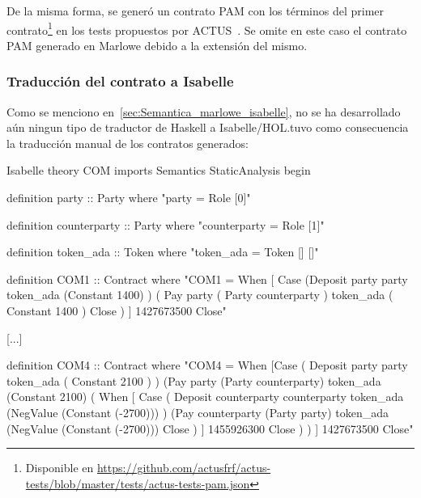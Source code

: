 \documentclass[12pt]{book}
\begin{document}
De la misma forma, se generó un contrato PAM con los términos del primer contrato\footnote{Disponible en \url{https://github.com/actusfrf/actus-tests/blob/master/tests/actus-tests-pam.json}} en los tests propuestos por ACTUS~\cite{ACTUS_Tests}. Se omite en este caso el contrato PAM generado en Marlowe debido a la extensión del mismo.

\subsubsection{Traducción del contrato a Isabelle}

Como se menciono en~\ref{sec:Semantica_marlowe_isabelle}, no se ha desarrollado aún ningun tipo de traductor de Haskell a Isabelle/HOL.\@Esto tuvo como consecuencia la traducción manual de los contratos generados:

\begin{code}[title=Teoría COM.]{Isabelle}
theory COM 
imports Semantics StaticAnalysis
begin

definition party :: Party where
"party = Role [0]"

definition counterparty :: Party where
"counterparty = Role [1]"

definition token_ada :: Token where
"token_ada = Token [] []"

definition COM1 :: Contract where
"COM1 = When
            [ Case
                (Deposit 
                    party
                    party
                    token_ada
                    (Constant 1400)
                )
            ( Pay party
                ( Party counterparty )
                token_ada
                ( Constant 1400 ) Close
            )
            ]
            1427673500
            Close"

[...]

definition COM4 :: Contract where
"COM4 = When
    [Case
        ( Deposit 
            party
            party
            token_ada
            ( Constant 2100 )
        )
        (Pay 
            party
            (Party counterparty)
            token_ada
            (Constant 2100)
            ( When
                [ Case
                    ( Deposit 
                        counterparty
                        counterparty
                        token_ada
                        (NegValue (Constant (-2700)))
                    )
                    (Pay 
                        counterparty
                        (Party party)
                        token_ada
                        (NegValue (Constant (-2700)))
                        Close
                    )
                ]
                1455926300 
                Close
            )
        )
    ]
    1427673500
    Close"
\end{code}
\end{document}
